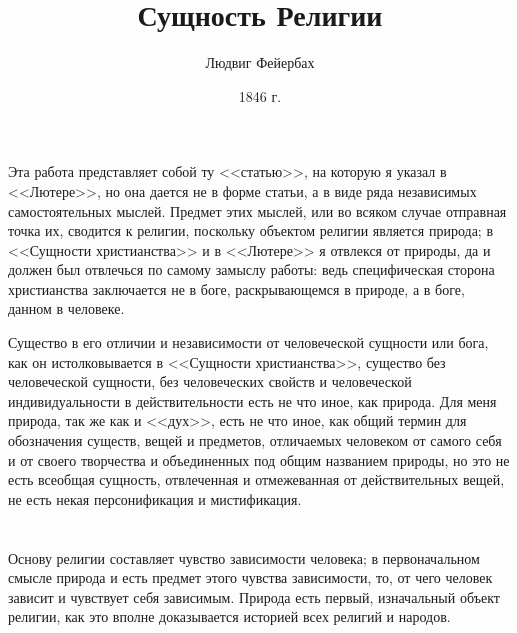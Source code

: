\documentclass[12pt]{article}
\title{Сущность Религии}
\author{Людвиг Фейербах}
\date{1846 г.}
\begin{document}
\maketitle

\tableofcontents

\section{}

Эта работа представляет собой ту <<статью>>, на которую я указал в <<Лютере>>, но она дается не в форме статьи, а в виде ряда независимых самостоятельных мыслей. Предмет этих мыслей, или во всяком случае отправная точка их, сводится к религии, поскольку объектом религии является природа; в <<Сущности христианства>> и в <<Лютере>> я отвлекся от природы, да и должен был отвлечься по самому замыслу работы: ведь специфическая сторона христианства заключается не в боге, раскрывающемся в природе, а в боге, данном в человеке.

Существо в его отличии и независимости от человеческой сущности или бога, как он истолковывается в <<Сущности христианства>>, существо без человеческой сущности, без человеческих свойств и человеческой индивидуальности в действительности есть не что иное, как природа. Для меня природа, так же как и <<дух>>, есть не что иное, как общий термин для обозначения существ, вещей и предметов, отличаемых человеком от самого себя и от своего творчества и объединенных под общим названием природы, но это не есть всеобщая сущность, отвлеченная и отмежеванная от действительных вещей, не есть некая персонификация и мистификация.



\section{}

Основу религии составляет чувство зависимости человека; в первоначальном смысле природа и есть предмет этого чувства зависимости, то, от чего человек зависит и чувствует себя зависимым. Природа есть первый, изначальный объект религии, как это вполне доказывается историей всех религий и народов.



\section{}
\end{document}
